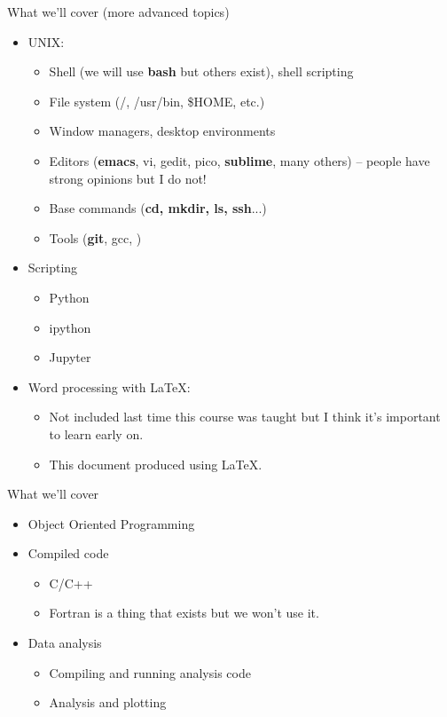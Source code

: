\documentclass[10pt]{beamer}
\begin{document}
\begin{frame}[fragile]{What we'll cover (more advanced topics)}

    \begin{itemize}
    	\item UNIX:
    	\begin{itemize}
    		\item Shell (we will use \textbf{bash} but others exist), shell scripting
    		\item File system (/, /usr/bin, \$HOME, etc.)
    		\item Window managers, desktop environments
    		\item Editors (\textbf{emacs}, vi, gedit, pico, \textbf{sublime}, many others) -- people have strong opinions but I do not!
    		\item Base commands (\textbf{cd, mkdir, ls, ssh}...)
		\item Tools (\textbf{git}, gcc, )
    	\end{itemize}
    	\item Scripting
    	\begin{itemize}
    		\item Python
    		\item ipython
    		\item Jupyter
    	\end{itemize}
	\item Word processing with \LaTeX:
	\begin{itemize}
		\item Not included last time this course was taught but I think it's important to learn early on.
		\item This document produced using \LaTeX.
	\end{itemize}
	
	 \end{itemize}
\end{frame}	

\begin{frame}[fragile]{What we'll cover}
    \begin{itemize}
		
    	\item Object Oriented Programming
    	\item Compiled code
    	\begin{itemize}
    		\item C/C++
    		\item Fortran is a thing that exists but we won't use it.
    	\end{itemize}		
    	
    	\item Data analysis
	\begin{itemize}
		\item Compiling and running analysis code
    		\item Analysis and plotting
    	\end{itemize}		
    
    \end{itemize}

\end{frame}
\end{document}
